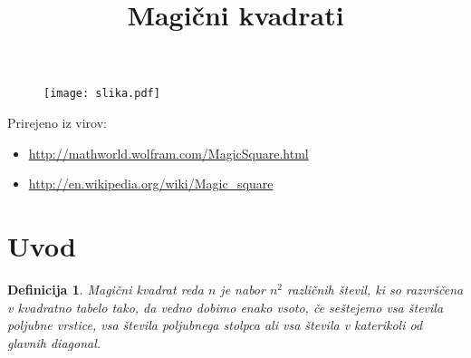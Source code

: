 \documentclass[a4paper,12pt]{article}
\title{Magični kvadrati}
\date{}
\newtheorem{definicija}[izrek]{Definicija}
\newcommand{\pojem}[1]{\emph{}{\color{purple}#1}}
\begin{document}
\maketitle


\begin{figure}
   \centering
   \texttt{[image: slika.pdf]}
\end{figure}

Prirejeno iz virov:

\begin{itemize}
   \item \url{http://mathworld.wolfram.com/MagicSquare.html}
   \item \url{http://en.wikipedia.org/wiki/Magic_square}
\end{itemize}


\tableofcontents


\newpage

\section{Uvod}

\begin{definicija}
   \pojem{Magični kvadrat} reda $n$ je nabor $n^2$ različnih števil,
   ki so razvrščena v kvadratno tabelo tako, da vedno dobimo enako vsoto,
   če seštejemo vsa števila poljubne vrstice, vsa števila poljubnega
   stolpca ali vsa števila v katerikoli od glavnih diagonal.
\end{definicija}
\end{document}
